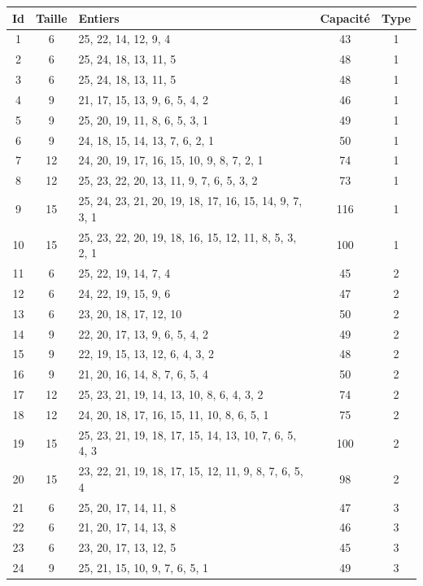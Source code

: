 \begin{table}[b]
  \small
  \centering
\begin{tabular}{cclcc}
  \toprule
Id & Taille & Entiers & Capacité & Type \\
  \midrule
  1 &   6 & 25, 22, 14, 12, 9, 4 &  43 &   1 \\
    2 &   6 & 25, 24, 18, 13, 11, 5 &  48 &   1 \\
    3 &   6 & 25, 24, 18, 13, 11, 5 &  48 &   1 \\
    4 &   9 & 21, 17, 15, 13, 9, 6, 5, 4, 2 &  46 &   1 \\
    5 &   9 & 25, 20, 19, 11, 8, 6, 5, 3, 1 &  49 &   1 \\
    6 &   9 & 24, 18, 15, 14, 13, 7, 6, 2, 1 &  50 &   1 \\
    7 &  12 & 24, 20, 19, 17, 16, 15, 10, 9, 8, 7, 2, 1 &  74 &   1 \\
    8 &  12 & 25, 23, 22, 20, 13, 11, 9, 7, 6, 5, 3, 2 &  73 &   1 \\
    9 &  15 & 25, 24, 23, 21, 20, 19, 18, 17, 16, 15, 14, 9, 7, 3, 1 & 116 &   1 \\
   10 &  15 & 25, 23, 22, 20, 19, 18, 16, 15, 12, 11, 8, 5, 3, 2, 1 & 100 &   1 \\
   11 &   6 & 25, 22, 19, 14, 7, 4 &  45 &   2 \\
   12 &   6 & 24, 22, 19, 15, 9, 6 &  47 &   2 \\
   13 &   6 & 23, 20, 18, 17, 12, 10 &  50 &   2 \\
   14 &   9 & 22, 20, 17, 13, 9, 6, 5, 4, 2 &  49 &   2 \\
   15 &   9 & 22, 19, 15, 13, 12, 6, 4, 3, 2 &  48 &   2 \\
   16 &   9 & 21, 20, 16, 14, 8, 7, 6, 5, 4 &  50 &   2 \\
   17 &  12 & 25, 23, 21, 19, 14, 13, 10, 8, 6, 4, 3, 2 &  74 &   2 \\
   18 &  12 & 24, 20, 18, 17, 16, 15, 11, 10, 8, 6, 5, 1 &  75 &   2 \\
   19 &  15 & 25, 23, 21, 19, 18, 17, 15, 14, 13, 10, 7, 6, 5, 4, 3 & 100 &   2 \\
   20 &  15 & 23, 22, 21, 19, 18, 17, 15, 12, 11, 9, 8, 7, 6, 5, 4 &  98 &   2 \\
   21 &   6 & 25, 20, 17, 14, 11, 8 &  47 &   3 \\
   22 &   6 & 21, 20, 17, 14, 13, 8 &  46 &   3 \\
   23 &   6 & 23, 20, 17, 13, 12, 5 &  45 &   3 \\
   24 &   9 & 25, 21, 15, 10, 9, 7, 6, 5, 1 &  49 &   3 \\

\end{tabular}
\end{table}
